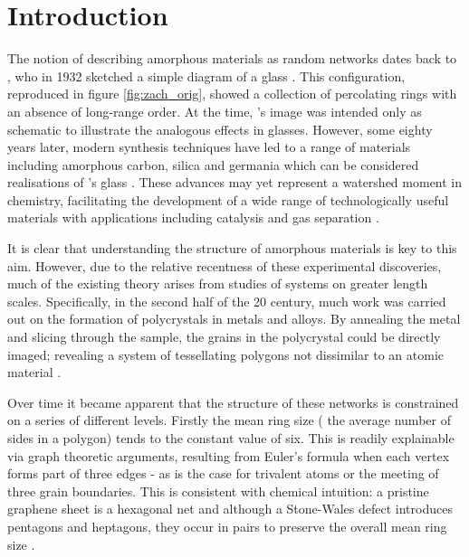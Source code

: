 \chapter{Introduction}
\label{ch:intro}


The notion of describing amorphous materials as random networks dates back to \zach, who in 1932 sketched a simple diagram of a \td{} glass \cite{Zachariasen1932}.
This configuration, reproduced in figure \ref{fig:zach_orig}, showed a collection of percolating rings with an absence of long\--range order.
At the time, \zach's image was intended only as schematic to illustrate the analogous effects in \thd{} glasses.
However, some eighty years later, modern synthesis techniques have led to a range of \td{} materials including amorphous carbon, silica and germania which can be considered realisations of \zach's glass \cite{Kotakoski2011,Robertson2012,Huang2012,Lichtenstein2012a,Shaikhutdinov2013,Lewandowski2018,Lewandowski2019}.
These advances may yet represent a watershed moment in chemistry, facilitating the development of a wide range of technologically useful materials with applications including catalysis and gas separation \cite{Trogadas2014,Sun2015a,Buchner2017}.

It is clear that understanding the structure of amorphous materials is key to this aim.
However, due to the relative recentness of these experimental discoveries, much of the existing theory arises from studies of systems on greater length scales.
Specifically, in the second half of the 20\th{} century, much work was carried out on the formation of polycrystals in metals and alloys.
By annealing the metal and slicing through the sample, the grains in the polycrystal could be directly imaged; revealing a system of tessellating polygons not dissimilar to an atomic material \cite{Beck1954,Dunn1957}.

Over time it became apparent that the structure of these networks is constrained on a series of different levels.
Firstly the mean ring size (\ie{} the average number of sides in a polygon) tends to the constant value of six.
This is readily explainable via graph theoretic arguments, resulting from Euler's formula when each vertex forms part of three edges - as is the case for trivalent atoms or the meeting of three grain boundaries.
This is consistent with chemical intuition: a pristine graphene sheet is a hexagonal net and although a Stone\--Wales defect introduces pentagons and heptagons, they occur in pairs to preserve the overall mean ring size \cite{Stone1986}.

